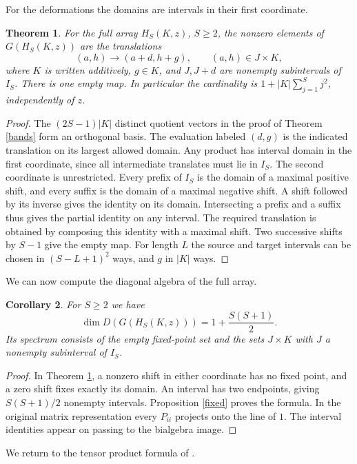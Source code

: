 \documentclass[11pt,a4paper]{article}
\newtheorem{thm}{Theorem}[section]
\newtheorem{cor}[thm]{Corollary}
\begin{document}
For the deformations the domains are intervals in their first coordinate.

\begin{thm}\label{interval}
For the full array $H_S(K,z)$, $S\geq2$, the nonzero elements of $G(H_S(K,z))$ are the translations
\[
 (a,h)\to(a+d,h+g),\qquad (a,h)\in J\times K ,
\]
where $K$ is written additively, $g\in K$, and $J,J+d$ are nonempty subintervals of $I_S$. There is one empty map. In particular the cardinality is $1+|K|\sum_{j=1}^S j^2$, independently of $z$.
\end{thm}
\begin{proof}
The $(2S-1)|K|$ distinct quotient vectors in the proof of Theorem \ref{bands} form an orthogonal basis. The evaluation labeled $(d,g)$ is the indicated translation on its largest allowed domain. Any product has interval domain in the first coordinate, since all intermediate translates must lie in $I_S$. The second coordinate is unrestricted. Every prefix of $I_S$ is the domain of a maximal positive shift, and every suffix is the domain of a maximal negative shift. A shift followed by its inverse gives the identity on its domain. Intersecting a prefix and a suffix thus gives the partial identity on any interval. The required translation is obtained by composing this identity with a maximal shift. Two successive shifts by $S-1$ give the empty map. For length $L$ the source and target intervals can be chosen in $(S-L+1)^2$ ways, and $g$ in $|K|$ ways.
\end{proof}

We can now compute the diagonal algebra of the full array.

\begin{cor}
For $S\geq2$ we have
\[
 \dim D(G(H_S(K,z)))=1+\frac{S(S+1)}2 .
\]
Its spectrum consists of the empty fixed-point set and the sets $J\times K$ with $J$ a nonempty subinterval of $I_S$.
\end{cor}
\begin{proof}
In Theorem \ref{interval}, a nonzero shift in either coordinate has no fixed point, and a zero shift fixes exactly its domain. An interval has two endpoints, giving $S(S+1)/2$ nonempty intervals. Proposition \ref{fixed} proves the formula. In the original matrix representation every $P_{ii}$ projects onto the line of $1$. The interval identities appear on passing to the bialgebra image.
\end{proof}

We return to the tensor product formula of \cite{bs}.
\end{document}

